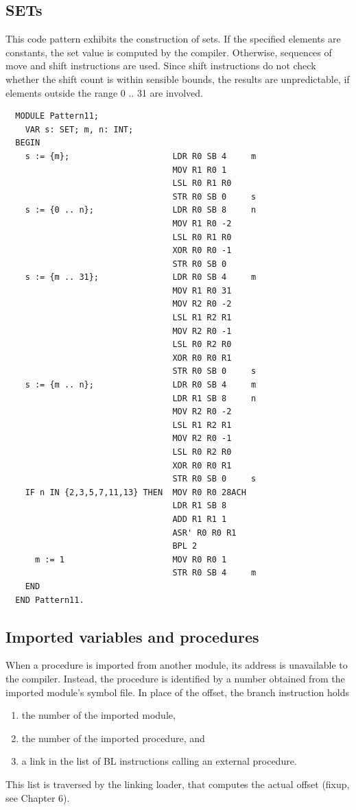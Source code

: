 \subsection{SETs}
This code pattern exhibits the construction of sets. If the specified elements are constants, the set
value is computed by the compiler. Otherwise, sequences of move and shift instructions are used. Since
shift instructions do not check whether the shift count is within sensible bounds, the results are
unpredictable, if elements outside the range 0 .. 31 are involved.
\begin{verbatim}
  MODULE Pattern11;
    VAR s: SET; m, n: INT;
  BEGIN
    s := {m};                     LDR R0 SB 4     m 
                                  MOV R1 R0 1
                                  LSL R0 R1 R0
                                  STR R0 SB 0     s
    s := {0 .. n};                LDR R0 SB 8     n
                                  MOV R1 R0 -2
                                  LSL R0 R1 R0
                                  XOR R0 R0 -1
                                  STR R0 SB 0
    s := {m .. 31};               LDR R0 SB 4     m
                                  MOV R1 R0 31
                                  MOV R2 R0 -2
                                  LSL R1 R2 R1
                                  MOV R2 R0 -1
                                  LSL R0 R2 R0
                                  XOR R0 R0 R1
                                  STR R0 SB 0     s
    s := {m .. n};                LDR R0 SB 4     m
                                  LDR R1 SB 8     n
                                  MOV R2 R0 -2
                                  LSL R1 R2 R1
                                  MOV R2 R0 -1
                                  LSL R0 R2 R0
                                  XOR R0 R0 R1
                                  STR R0 SB 0     s
    IF n IN {2,3,5,7,11,13} THEN  MOV R0 R0 28ACH
                                  LDR R1 SB 8
                                  ADD R1 R1 1
                                  ASR' R0 R0 R1
                                  BPL 2
      m := 1                      MOV R0 R0 1
                                  STR R0 SB 4     m
    END
  END Pattern11.
\end{verbatim}

\subsection{Imported variables and procedures}
\label{ssc:ptn12}
When a procedure is imported from another module, its address is unavailable to the compiler. Instead,
the procedure is identified by a number obtained from the imported module's symbol file. In place of
the offset, the branch instruction holds
\begin{enumerate}
  \item the number of the imported module,
  \item the number of the imported procedure, and
  \item a link in the list of BL instructions calling an external procedure.
\end{enumerate}
This list is traversed by the linking loader, that computes the actual offset (fixup, see Chapter 6).

